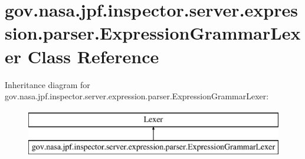 \hypertarget{classgov_1_1nasa_1_1jpf_1_1inspector_1_1server_1_1expression_1_1parser_1_1_expression_grammar_lexer}{}\section{gov.\+nasa.\+jpf.\+inspector.\+server.\+expression.\+parser.\+Expression\+Grammar\+Lexer Class Reference}
\label{classgov_1_1nasa_1_1jpf_1_1inspector_1_1server_1_1expression_1_1parser_1_1_expression_grammar_lexer}
Inheritance diagram for gov.\+nasa.\+jpf.\+inspector.\+server.\+expression.\+parser.\+Expression\+Grammar\+Lexer\+:\begin{figure}[H]
\begin{center}
\leavevmode
\includegraphics[height=2.000000cm]{classgov_1_1nasa_1_1jpf_1_1inspector_1_1server_1_1expression_1_1parser_1_1_expression_grammar_lexer}
\end{center}
\end{figure}
